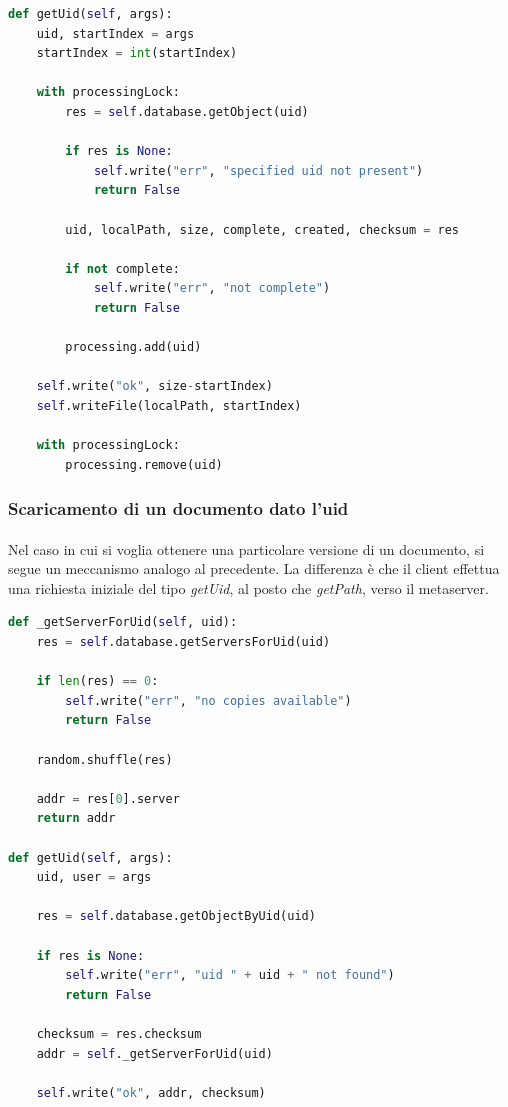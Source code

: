\documentclass[11pt,a4paper,english]{article}
\begin{document}
\begin{lstlisting}[language=Python, title=Codice]
def getUid(self, args):
    uid, startIndex = args
    startIndex = int(startIndex)

    with processingLock:
        res = self.database.getObject(uid)

        if res is None:
            self.write("err", "specified uid not present")
            return False

        uid, localPath, size, complete, created, checksum = res

        if not complete:
            self.write("err", "not complete")
            return False

        processing.add(uid)

    self.write("ok", size-startIndex)
    self.writeFile(localPath, startIndex)

    with processingLock:
        processing.remove(uid)
\end{lstlisting}

\subsubsection{Scaricamento di un documento dato l'uid}

\paragraph{} Nel caso in cui si voglia ottenere una particolare versione di un documento, si segue un meccanismo analogo al precedente. La differenza è che il client effettua una richiesta iniziale del tipo \emph{getUid}, al posto che \emph{getPath}, verso il metaserver. 

\begin{lstlisting}[language=Python, title=Metaserver]
def _getServerForUid(self, uid):
    res = self.database.getServersForUid(uid)

    if len(res) == 0:
        self.write("err", "no copies available")
        return False

    random.shuffle(res)

    addr = res[0].server
    return addr

def getUid(self, args):
    uid, user = args

    res = self.database.getObjectByUid(uid)

    if res is None:
        self.write("err", "uid " + uid + " not found")
        return False

    checksum = res.checksum
    addr = self._getServerForUid(uid)

    self.write("ok", addr, checksum)
\end{lstlisting}
\end{document}
